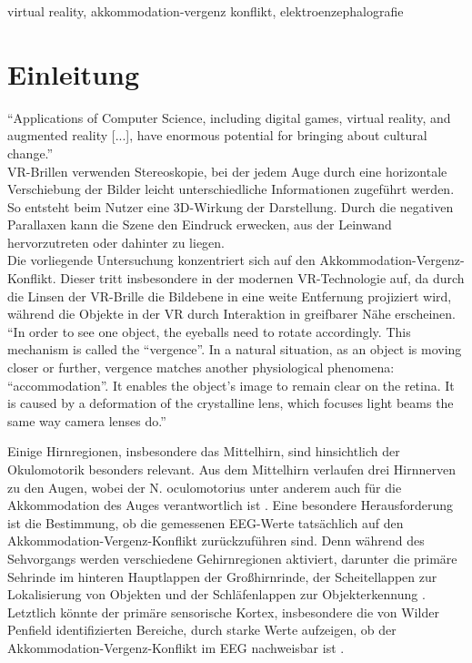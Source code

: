 \documentclass[conference]{IEEEtran}
\begin{document}
\begin{IEEEkeywords}
virtual reality, akkommodation-vergenz konflikt, elektroenzephalografie
\end{IEEEkeywords}

\section{Einleitung}
“Applications of Computer Science, including digital games, virtual reality, and augmented reality [...], have enormous potential for bringing about cultural change.”\cite{b2}\\
VR-Brillen verwenden Stereoskopie, bei der jedem Auge durch eine horizontale Verschiebung der Bilder leicht unterschiedliche Informationen zugeführt werden. So entsteht beim Nutzer eine 3D-Wirkung der Darstellung. Durch die negativen Parallaxen kann die Szene den Eindruck erwecken, aus der Leinwand hervorzutreten oder dahinter zu liegen.\cite{b3}\\
Die vorliegende Untersuchung konzentriert sich auf den Akkommodation-Vergenz-Konflikt. Dieser tritt insbesondere in der modernen VR-Technologie auf, da durch die Linsen der VR-Brille die Bildebene in eine weite Entfernung projiziert wird, während die Objekte in der VR durch Interaktion in greifbarer Nähe erscheinen.
“In order to see one object, the eyeballs need to rotate accordingly. This mechanism is called the “vergence”. In a natural situation, as an object is moving closer or further, vergence matches another physiological phenomena: “accommodation”. It enables the object’s image to remain clear on the retina. It is caused by a deformation of the crystalline lens, which focuses light beams the same way camera lenses do.”\cite{b4}

Einige Hirnregionen, insbesondere das Mittelhirn, sind hinsichtlich der Okulomotorik besonders relevant. Aus dem Mittelhirn verlaufen drei Hirnnerven zu den Augen, wobei der N. oculomotorius unter anderem auch für die Akkommodation des Auges verantwortlich ist \cite{b5}. Eine besondere Herausforderung ist die Bestimmung, ob die gemessenen EEG-Werte tatsächlich auf den Akkommodation-Vergenz-Konflikt zurückzuführen sind. Denn während des Sehvorgangs werden verschiedene Gehirnregionen aktiviert, darunter die primäre Sehrinde im hinteren Hauptlappen der Großhirnrinde, der Scheitellappen zur Lokalisierung von Objekten und der Schläfenlappen zur Objekterkennung \cite{b6}. Letztlich könnte der primäre sensorische Kortex, insbesondere die von Wilder Penfield identifizierten Bereiche, durch starke Werte aufzeigen, ob der Akkommodation-Vergenz-Konflikt im EEG nachweisbar ist \cite{b7}.
\end{document}
